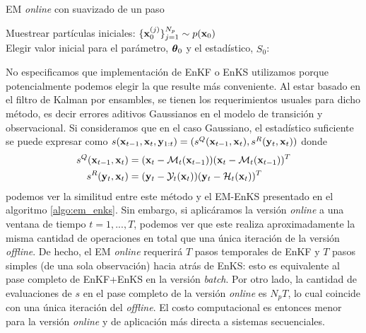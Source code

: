 \begin{algorithm}[h]
\caption{EM \textit{online} con suavizado de un paso}
\label{algo:onlineEM_OSS}
    
    Muestrear partículas iniciales: $\{\mathbf{x}_0^{(j)}\}_{j=1}^{N_p} \sim p(\mathbf{x}_0)$ \\
    Elegir valor inicial para el parámetro, $\mbox{\boldmath$ \theta $}_0$ y el estadístico, $\widehat{S_0}$: \\
\end{algorithm}
No especificamos que implementación de EnKF o EnKS utilizamos porque potencialmente podemos elegir la que resulte más conveniente. Al estar basado en el filtro de Kalman por ensambles, se tienen los requerimientos usuales para dicho método, es decir errores aditivos Gaussianos en el modelo de transición y observacional. Si consideramos que en el caso Gaussiano, el estadístico suficiente 
se puede expresar como $s(\mathbf{x}_{t-1}, \mathbf{x}_t, \mathbf{y}_{1:t}) = (s^Q(\mathbf{x}_{t-1}, \mathbf{x}_t), s^R(\mathbf{y}_t, \mathbf{x}_t))$ donde
\begin{align*}
    s^Q(\mathbf{x}_{t-1}, \mathbf{x}_t) &= (\mathbf{x}_t - \mathcal{M}_t(\mathbf{x}_{t-1}))(\mathbf{x}_t - \mathcal{M}_t(\mathbf{x}_{t-1}))^T \\
    s^R(\mathbf{y}_t, \mathbf{x}_t) &= (\mathbf{y}_t - \mathcal{Y}_t(\mathbf{x}_t))(\mathbf{y}_t - \mathcal{H}_t(\mathbf{x}_t))^T
\end{align*}
podemos ver la similitud entre este método y el EM-EnKS presentado en el algoritmo \ref{algo:em_enks}. Sin embargo, si aplicáramos  la versión \textit{online} a una ventana de tiempo $t = 1, ..., T$, podemos ver que este realiza aproximadamente la misma cantidad de operaciones en total que una única iteración de la versión \textit{offline}. De hecho, el EM \textit{online} requerirá $T$ pasos temporales de EnKF y $T$ pasos simples (de una sola observación) hacia atrás de EnKS: esto es equivalente al pase completo de EnKF+EnKS en la versión \textit{batch}. Por otro lado, la cantidad de evaluaciones de $s$ en el pase completo de la versión \textit{online} es $N_p T$, lo cual coincide con una única iteración del \textit{offline}. El costo computacional es entonces menor para la versión \textit{online} y de aplicación más directa a sistemas secuenciales.

